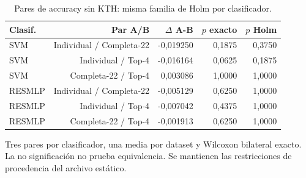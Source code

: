 \begin{table}[!htbp]\centering
\fontsize{8}{10}\selectfont\setlength{\tabcolsep}{4pt}
\caption{Pares de accuracy sin KTH: misma familia de Holm por clasificador.}\label{tab:ars-static-no-kth-pairs}
\begin{tabular}{@{}lrrrr@{}}\toprule
Clasif. & Par A/B & $\Delta$ A-B & $p$ exacto & $p$ Holm\\\midrule
SVM & Individual / Completa-22 & -0,019250 & 0,1875 & 0,3750\\
SVM & Individual / Top-4 & -0,016164 & 0,0625 & 0,1875\\
SVM & Completa-22 / Top-4 & 0,003086 & 1,0000 & 1,0000\\
RESMLP & Individual / Completa-22 & -0,005129 & 0,6250 & 1,0000\\
RESMLP & Individual / Top-4 & -0,007042 & 0,4375 & 1,0000\\
RESMLP & Completa-22 / Top-4 & -0,001913 & 0,6250 & 1,0000\\
\bottomrule\end{tabular}
\par\smallskip\begin{minipage}{0.98\textwidth}\footnotesize Tres pares por clasificador, una media por dataset y Wilcoxon bilateral exacto. La no significación no prueba equivalencia. Se mantienen las restricciones de procedencia del archivo estático.\end{minipage}
\end{table}
